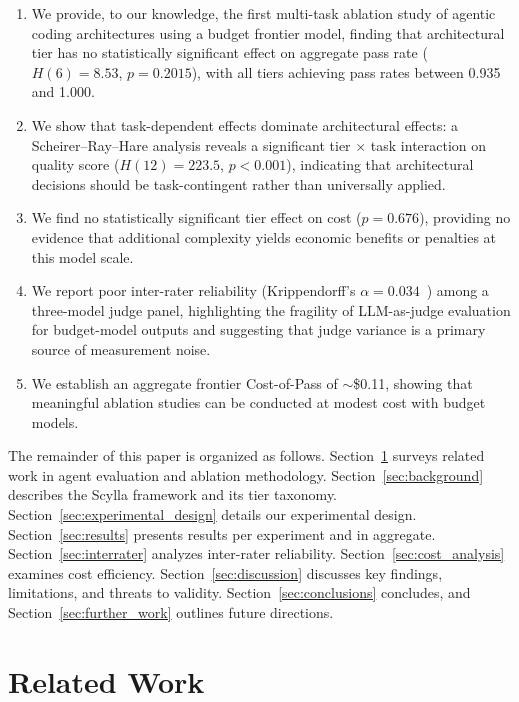\documentclass[11pt]{article}
\begin{document}
\begin{enumerate}
  \item We provide, to our knowledge, the first multi-task ablation study of
    agentic coding architectures using a budget frontier model, finding that
    architectural tier has no statistically significant effect on aggregate
    pass rate ($H(6)=8.53$, $p=0.2015$), with all tiers achieving pass rates
    between 0.935 and 1.000.
  \item We show that task-dependent effects dominate architectural effects:
    a Scheirer--Ray--Hare analysis reveals a significant tier $\times$ task
    interaction on quality score ($H(12)=223.5$, $p<0.001$), indicating that
    architectural decisions should be task-contingent rather than universally
    applied.
  \item We find no statistically significant tier effect on cost ($p=0.676$),
    providing no evidence that additional complexity yields economic benefits
    or penalties at this model scale.
  \item We report poor inter-rater reliability (Krippendorff's $\alpha=0.034$~\cite{krippendorff2004content}) among a
    three-model judge panel, highlighting the fragility of LLM-as-judge
    evaluation for budget-model outputs and suggesting that judge variance is
    a primary source of measurement noise.
  \item We establish an aggregate frontier Cost-of-Pass of ${\sim}$\$0.11,
    showing that meaningful ablation studies can be conducted at modest
    cost with budget models.
\end{enumerate}

The remainder of this paper is organized as follows.
Section~\ref{sec:related_work} surveys related work in agent evaluation and
ablation methodology. Section~\ref{sec:background} describes the Scylla
framework and its tier taxonomy. Section~\ref{sec:experimental_design} details
our experimental design. Section~\ref{sec:results} presents results per
experiment and in aggregate. Section~\ref{sec:interrater} analyzes inter-rater
reliability. Section~\ref{sec:cost_analysis} examines cost efficiency.
Section~\ref{sec:discussion} discusses key findings, limitations, and threats
to validity. Section~\ref{sec:conclusions} concludes, and
Section~\ref{sec:further_work} outlines future directions.

\section{Related Work}
\label{sec:related_work}
\end{document}
